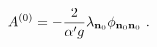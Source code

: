 \begin{equation}
A^{\left( 0\right) }=-\frac{2}{\alpha' g}
\lambda _{\mathbf{n}_{0}}\phi _{\mathbf{n}_{0}\mathbf{%
n}_{0}}\,\,.
\end{equation}%

